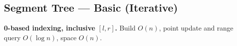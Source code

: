 \documentclass[9pt,a4paper]{extarticle}
\begin{document}
\clearpage
\begingroup


\newcommand{\seghead}[1]{%
  \par\vspace{5pt}\noindent
  {\bfseries\fontsize{10.4}{12.22}\selectfont #1}%
  \par\vspace{1pt}\hrule\vspace{3pt}
}

\newcommand{\segcode}[1]{%
  {\ttfamily\fontsize{8}{9.52}\selectfont
   \detokenize{#1}}%
}

\newcommand{\segpattern}[3]{%
  {\bfseries #1}\par
  {\fontsize{9.25}{10.82}\selectfont
    \textbf{Problem:} #2\par
    \textbf{Approach:} #3\par
  }\vspace{3pt}
}


\subsection{Segment Tree --- Basic (Iterative)}
\vspace{2pt}

{\small
\textbf{0-based indexing, inclusive $[l,r]$.}
Build $O(n)$, point update and range query
$O(\log n)$, space $O(n)$.
}

\vspace{4pt}
\noindent

\end{document}
